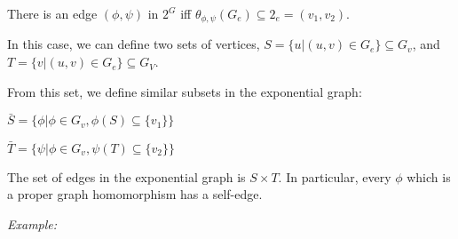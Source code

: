 \documentclass[notitlepage]{article}
\begin{document}
\begin{enumerate}
     There is an edge $(\phi, \psi)$ in $2^G$ iff $\theta_{\phi,\psi}(G_e) \subseteq 2_e = {(v_1,v_2)}$.

     In this case, we can define two sets of vertices, $S = \{ u \vert (u,v) \in G_e \} \subseteq G_v$, and
     $T = \{ v \vert (u,v) \in G_e \} \subseteq G_V$.

     From this set, we define similar subsets in the exponential graph:

     $\bar{S} = \{ \phi \vert \phi \in G_v, \phi(S) \subseteq \{ v_1 \} \}$

     $\bar{T} = \{ \psi \vert \phi \in G_v, \psi(T) \subseteq \{ v_2 \} \}$

     The set of edges in the exponential graph is $S \times T$. In particular,
     every $\phi$ which is a proper graph homomorphism has a self-edge.

     {\em Example:}
     
     \begin{dot2tex}[neato]
       
     \end{dot2tex}
     
     \begin{dot2tex}[neato]
       
     \end{dot2tex}

     {\Large
     \begin{dot2tex}[fdp,autosize,scale=0.5]
       
     \end{dot2tex}
     }
     
\end{enumerate}
\end{document}
